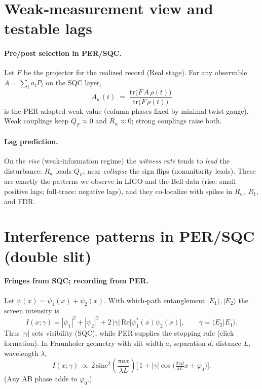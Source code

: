\documentclass[11pt]{article}
\begin{document}
\section{Weak‑measurement view and testable lags}
\label{sec:weak}

\paragraph{Pre/post selection in PER/SQC.}
Let $F$ be the projector for the realized record (Real stage). For any observable $A=\sum_i a_i P_i$ on the SQC layer,
\[
A_w(t) \;=\; \frac{\mathrm{tr}\!\big(F\,A\,\rho(t)\big)}{\mathrm{tr}\!\big(F\,\rho(t)\big)}
\]
is the PER‑adapted weak value (column phases fixed by minimal‑twist gauge). Weak couplings keep $Q_F\!\approx\!0$ and $R_w\!\approx\!0$; strong couplings raise both.

\paragraph{Lag prediction.}
On the \emph{rise} (weak‑information regime) the \emph{witness rate} tends to \emph{lead} the disturbance: $R_w$ leads $\dot Q_F$;
near \emph{collapse} the sign flips (nonunitarity leads).
These are exactly the patterns we observe in LIGO and the Bell data (rise: small positive lags; full‑trace: negative lags), and they co‑localize with spikes in $R_w$, $R_1$, and FDR.

\section{Interference patterns in PER/SQC (double slit)}
\label{sec:double-slit}

\paragraph{Fringes from SQC; recording from PER.}
Let $\psi(x)=\psi_1(x)+\psi_2(x)$. With which‑path entanglement $|E_1\rangle,|E_2\rangle$ the screen intensity is
\[
I(x;\gamma)=|\psi_1|^2+|\psi_2|^2
+2\,|\gamma|\,\mathrm{Re}\!\big[\psi_1^*(x)\psi_2(x)\big],\qquad
\gamma=\langle E_2|E_1\rangle.
\]
Thus $|\gamma|$ sets visibility (SQC), while PER supplies the stopping rule (click formation).
In Fraunhofer geometry with slit width $a$, separation $d$, distance $L$, wavelength $\lambda$,
\[
I(x;\gamma)\ \propto\ 2\,\mathrm{sinc}^2\!\!\left(\frac{\pi a x}{\lambda L}\right)\!\Big[\,1+|\gamma|\cos\!\Big(\tfrac{2\pi d}{\lambda L}x+\varphi_0\Big)\Big].
\]
(Any AB phase adds to $\varphi_0$.)
\end{document}
